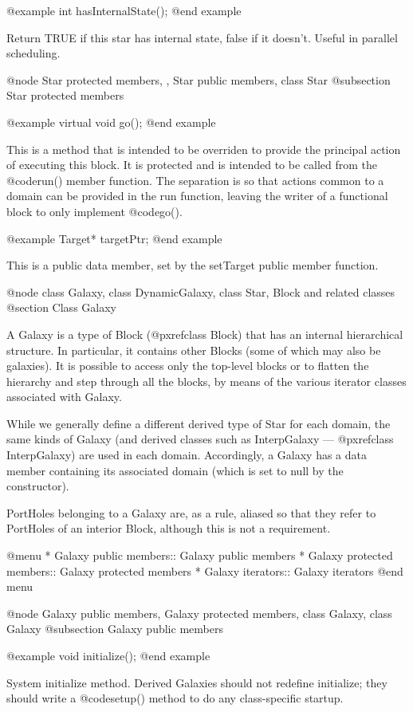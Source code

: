 @example
int hasInternalState();
@end example

Return TRUE if this star has internal state, false if it doesn't.
Useful in parallel scheduling.

@node Star protected members,  , Star public members, class Star
@subsection Star protected members

@example
virtual void go();
@end example

This is a method that is intended to be overriden to provide the
principal action of executing this block.  It is protected and is
intended to be called from the @code{run()} member function.  The
separation is so that actions common to a domain can be provided
in the run function, leaving the writer of a functional block to
only implement @code{go()}.

@example
Target* targetPtr;
@end example

This is a public data member, set by the setTarget public member
function.

@node class Galaxy, class DynamicGalaxy, class Star, Block and related classes
@section Class Galaxy

A Galaxy is a type of Block (@pxref{class Block})
that has an internal hierarchical structure.
In particular, it contains other Blocks (some of which may also be
galaxies).  It is possible to access only the top-level blocks or to
flatten the hierarchy and step through all the blocks, by means
of the various iterator classes associated with Galaxy.

While we generally define a different derived type of Star for each
domain, the same kinds of Galaxy (and derived classes such as
InterpGalaxy --- @pxref{class InterpGalaxy})
are used in each domain.  Accordingly,
a Galaxy has a data member containing its associated domain (which
is set to null by the constructor).

PortHoles belonging to a Galaxy are, as a rule, aliased so that they
refer to PortHoles of an interior Block, although this is not a
requirement.

@menu
* Galaxy public members::       Galaxy public members
* Galaxy protected members::    Galaxy protected members
* Galaxy iterators::            Galaxy iterators
@end menu

@node Galaxy public members, Galaxy protected members, class Galaxy, class Galaxy
@subsection Galaxy public members

@example
void initialize();
@end example

System initialize method.  Derived Galaxies should not redefine
initialize; they should write a @code{setup()} method to do any
class-specific startup.


